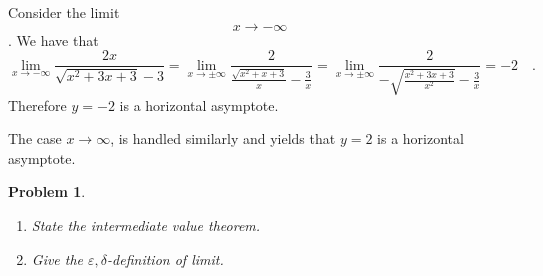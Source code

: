 \documentclass{article}
\newtheorem{problem}{Problem}
\begin{document}
Consider the limit $$x\to -\infty$$. We have that 
\[
\lim_{x\to -\infty} \frac{2x}{\sqrt{x^2+3x+3}-3}= \lim_{x\to \pm \infty} \frac{2}{\frac{\sqrt{x^2+x+3}}x-\frac3x}=\lim_{x\to \pm \infty} \frac{2}{-\sqrt{\frac{x^2+3x+3}{x^2}}-\frac3x} =-2\quad . 
\]
Therefore $y=-2$ is a horizontal asymptote. 

The case $x\to \infty$, is handled similarly and yields that $y=2$ is a horizontal asymptote.


\begin{problem}~
\begin{enumerate}
\item State the intermediate value theorem.
\item Give the $\varepsilon,\delta$-definition of limit.
\end{enumerate}
\end{problem}
\end{document}

